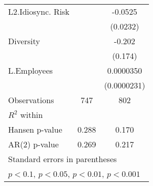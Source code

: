 \begin{table}[htbp]
{\begin{tabular}{l*{2}{c}}
L2.Idiosync. Risk   &                     &     -0.0525\sym{*}  \\
                    &                     &    (0.0232)         \\
Diversity           &                     &      -0.202         \\
                    &                     &     (0.174)         \\
L.Employees         &                     &   0.0000350         \\
                    &                     & (0.0000231)         \\
\hline
Observations        &         747         &         802         \\
$R^2$ within                &                     &                     \\
Hansen p-value             &       0.288         &       0.170         \\
AR(2) p-value                &       0.269         &       0.217         \\
\hline\hline
\multicolumn{3}{l}{\footnotesize Standard errors in parentheses}\\
\multicolumn{3}{l}{\footnotesize \sym{+} \(p<0.1\), \sym{*} \(p<0.05\), \sym{**} \(p<0.01\), \sym{***} \(p<0.001\)}\\
\end{tabular}
}

\end{table}

